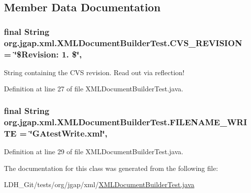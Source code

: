\subsection{Member Data Documentation}
\hypertarget{classorg_1_1jgap_1_1xml_1_1_x_m_l_document_builder_test_a5145c012ae35f40eaf22b67b748e4baa}{
\subsubsection[{C\-V\-S\-\_\-\-R\-E\-V\-I\-S\-I\-O\-N}]{\setlength{\rightskip}{0pt plus 5cm}final String org.\-jgap.\-xml.\-X\-M\-L\-Document\-Builder\-Test.\-C\-V\-S\-\_\-\-R\-E\-V\-I\-S\-I\-O\-N = \char`\"{}\$Revision\-: 1. \$\char`\"{}\hspace{0.3cm}{\ttfamily [static]}, {\ttfamily [private]}}}\label{classorg_1_1jgap_1_1xml_1_1_x_m_l_document_builder_test_a5145c012ae35f40eaf22b67b748e4baa}
String containing the C\-V\-S revision. Read out via reflection! 

Definition at line 27 of file X\-M\-L\-Document\-Builder\-Test.\-java.

\hypertarget{classorg_1_1jgap_1_1xml_1_1_x_m_l_document_builder_test_ad501d1f2c1a441f20e3e7e2e41eeb32d}{
\subsubsection[{F\-I\-L\-E\-N\-A\-M\-E\-\_\-\-W\-R\-I\-T\-E}]{\setlength{\rightskip}{0pt plus 5cm}final String org.\-jgap.\-xml.\-X\-M\-L\-Document\-Builder\-Test.\-F\-I\-L\-E\-N\-A\-M\-E\-\_\-\-W\-R\-I\-T\-E = \char`\"{}G\-Atest\-Write.\-xml\char`\"{}\hspace{0.3cm}{\ttfamily [static]}, {\ttfamily [private]}}}\label{classorg_1_1jgap_1_1xml_1_1_x_m_l_document_builder_test_ad501d1f2c1a441f20e3e7e2e41eeb32d}


Definition at line 29 of file X\-M\-L\-Document\-Builder\-Test.\-java.



The documentation for this class was generated from the following file\-:\begin{DoxyCompactItemize}
\item 
L\-D\-H\-\_\-\-Git/tests/org/jgap/xml/\hyperlink{_x_m_l_document_builder_test_8java}{X\-M\-L\-Document\-Builder\-Test.\-java}\end{DoxyCompactItemize}
